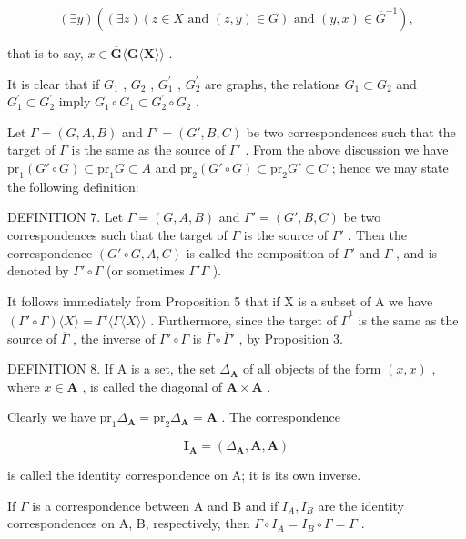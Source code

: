 \[
(\exists y) ((\exists z) (z \in X \text { and } (z, y) \in G) \text { and } (y, x) \in \overline {{G}} ^ {- 1}),
\]

that is to say, \(x \in \overline{\mathbf{G}}\langle \mathbf{G}\langle \mathbf{X}\rangle\rangle\) .

It is clear that if \(G_{1}\) , \(G_{2}\) , \(G_{1}^{\prime}\) , \(G_{2}^{\prime}\) are graphs, the relations \(G_{1} \subset G_{2}\) and \(G_{1}^{\prime} \subset G_{2}^{\prime}\) imply \(G_{1}^{\prime} \circ G_{1} \subset G_{2}^{\prime} \circ G_{2}\) .

Let \(\Gamma = (G, A, B)\) and \(\Gamma' = (G', B, C)\) be two correspondences such that the target of \(\Gamma\) is the same as the source of \(\Gamma'\) . From the above discussion we have \(\mathrm{pr}_1(G' \circ G) \subset \mathrm{pr}_1G \subset A\) and \(\mathrm{pr}_2(G' \circ G) \subset \mathrm{pr}_2G' \subset C\) ; hence we may state the following definition:

DEFINITION 7. Let \(\Gamma = (G, A, B)\) and \(\Gamma' = (G', B, C)\) be two correspondences such that the target of \(\Gamma\) is the source of \(\Gamma'\) . Then the correspondence \((G' \circ G, A, C)\) is called the composition of \(\Gamma'\) and \(\Gamma\) , and is denoted by \(\Gamma' \circ \Gamma\) (or sometimes \(\Gamma' \Gamma\) ).

It follows immediately from Proposition 5 that if X is a subset of A we have \((\Gamma'\circ\Gamma)\langle X\rangle=\Gamma'\langle\Gamma\langle X\rangle\rangle\) . Furthermore, since the target of \(\overline{\Gamma}^{1}\) is the same as the source of \(\overline{\Gamma}\) , the inverse of \(\Gamma'\circ\Gamma\) is \(\overline{\Gamma}\circ\overline{\Gamma}'\) , by Proposition 3.

DEFINITION 8. If A is a set, the set \(\Delta_{\mathbf{A}}\) of all objects of the form \((x, x)\) , where \(x \in \mathbf{A}\) , is called the diagonal of \(\mathbf{A} \times \mathbf{A}\) .

Clearly we have \(\mathrm{pr}_1\Delta_{\mathbf{A}} = \mathrm{pr}_2\Delta_{\mathbf{A}} = \mathbf{A}\) . The correspondence

\[
\mathbf {I} _ {\mathbf {A}} = (\Delta_ {\mathbf {A}}, \mathbf {A}, \mathbf {A})
\]

is called the identity correspondence on A; it is its own inverse.

If \(\Gamma\) is a correspondence between A and B and if \(I_{A}, I_{B}\) are the identity correspondences on A, B, respectively, then \(\Gamma \circ I_{A} = I_{B} \circ \Gamma = \Gamma\) .

